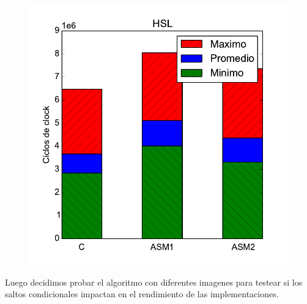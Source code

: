 \begin{figure}[h!]
	\centering
	\includegraphics[scale=0.5]{images/hsl_comparation}
\end{figure}

Luego decidimos probar el algoritmo con diferentes imagenes para testear si los saltos condicionales impactan en el rendimiento de las implementaciones.

